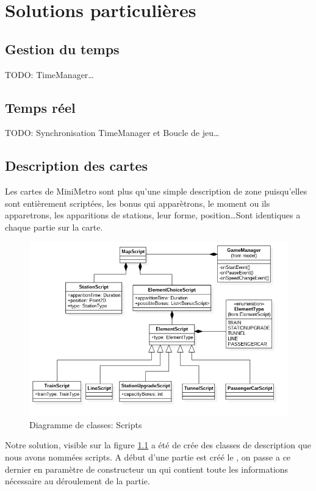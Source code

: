 \documentclass[report, backcover, french, nodocumentinfo]{upmethodology-document}
\begin{document}
	\chapter{Solutions particulières}
		\section{Gestion du temps}
			TODO: TimeManager\ldots
		\section{Temps réel}
			TODO: Synchronisation TimeManager et Boucle de jeu\ldots
		\section{Description des cartes}
				Les cartes de MiniMetro sont plus qu'une simple description de zone puisqu'elles sont entièrement scriptées, les bonus qui apparètrons, le moment ou ils apparetrons, les apparitions de stations, leur forme, position\ldots Sont identiques a chaque partie sur la carte.
				\begin{figure}[h!]
					\centering
					\includegraphics[width=\textwidth]{figures/ScriptsClassDiagram}
					\caption{Diagramme de classes: Scripts}
					\label{fig:ScriptsClassDiagram}
				\end{figure}
				Notre solution, visible sur la figure \ref{fig:ScriptsClassDiagram} a été de crée des classes de description que nous avons nommées scripts. A début d'une partie est créé le , on passe a ce dernier en paramètre de constructeur un  qui contient toute les informations nécessaire au déroulement de la partie.
\end{document}
